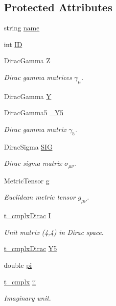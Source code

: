 \subsection*{Protected Attributes}
\begin{DoxyCompactItemize}
\item 
string \hyperlink{class_c___abs_diagram_a919d23735a009dc5a78e02e01e1eb40b}{name}
\item 
int \hyperlink{class_c___abs_diagram_a08de955405ee0344287b2eb5f6cb62b5}{I\-D}
\item 
Dirac\-Gamma \hyperlink{class_c___abs_diagram_a958ffee1be22aa70a0e2eb9fa44f5784}{Z}
\begin{DoxyCompactList}\small\item\em Dirac gamma matrices $ \gamma_\mu $. \end{DoxyCompactList}\item 
Dirac\-Gamma \hyperlink{class_c___abs_diagram_a4eded4aff0f19920d9ec52e2f5c63abf}{Y}
\item 
Dirac\-Gamma5 \hyperlink{class_c___abs_diagram_a31794dd2c315f6bf18e2908d669ccc61}{\-\_\-\-Y5}
\begin{DoxyCompactList}\small\item\em Dirac gamma matrix $ \gamma_5 $. \end{DoxyCompactList}\item 
Dirac\-Sigma \hyperlink{class_c___abs_diagram_ac4646ab596ff13dd531f28f755d3dd4e}{S\-I\-G}
\begin{DoxyCompactList}\small\item\em Dirac sigma matrix $ \sigma_{\mu\nu} $. \end{DoxyCompactList}\item 
Metric\-Tensor \hyperlink{class_c___abs_diagram_a4daaf1d6cbcb0aa0bc93417eb11b49a4}{g}
\begin{DoxyCompactList}\small\item\em Euclidean metric tensor $ g_{\mu\nu} $. \end{DoxyCompactList}\item 
\hyperlink{types_8h_ae924474dbd8b75d3e13a2674c4a06787}{t\-\_\-cmplx\-Dirac} \hyperlink{class_c___abs_diagram_aff57681049aaff10af1fd2a0151209b8}{I}
\begin{DoxyCompactList}\small\item\em Unit matrix (4,4) in Dirac space. \end{DoxyCompactList}\item 
\hyperlink{types_8h_ae924474dbd8b75d3e13a2674c4a06787}{t\-\_\-cmplx\-Dirac} \hyperlink{class_c___abs_diagram_a49ab5b499fd64c4a196349730d4beda3}{Y5}
\item 
double \hyperlink{class_c___abs_diagram_a3e24081668fb3198fd043dd291fba4c5}{pi}
\item 
\hyperlink{types_8h_aa75ae339052372f671bb263e6a272e82}{t\-\_\-cmplx} \hyperlink{class_c___abs_diagram_aa3cfb09af9c9e81fa1af3a78b5d667a7}{ii}
\begin{DoxyCompactList}\small\item\em Imaginary unit. \end{DoxyCompactList}\end{DoxyCompactItemize}


